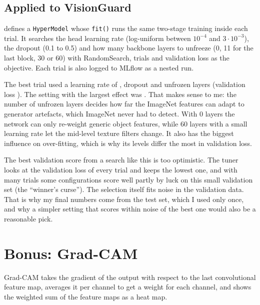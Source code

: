 \subsection*{Applied to VisionGuard}
 defines a \texttt{HyperModel} whose \texttt{fit()} runs the same two-stage
training inside each trial. It searches the head learning rate (log-uniform between $10^{-4}$ and
$3\cdot10^{-3}$), the dropout (0.1 to 0.5) and how many backbone layers to unfreeze (0, 11 for the
last block, 30 or 60) with RandomSearch, \vgTunerTrials{} trials and validation loss as the
objective. Each trial is also logged to MLflow as a nested run.


The best trial used a learning rate of \vgTunerBestLr, dropout \vgTunerBestDrop{} and
\vgTunerBestUnfrozen{} unfrozen layers (validation loss \vgTunerBestLoss). The setting with the
largest effect was \vgTunerMostImportant. That makes sense to me: the number of unfrozen layers
decides how far the ImageNet features can adapt to generator artefacts, which ImageNet never had to
detect. With 0 layers the network can only re-weight generic object features, while 60 layers with
a small learning rate let the mid-level texture filters change. It also has the biggest influence
on over-fitting, which is why its levels differ the most in validation loss.

The best validation score from a search like this is too optimistic. The tuner looks at the
validation loss of every trial and keeps the lowest one, and with many trials some configurations
score well partly by luck on this small validation set (the ``winner's curse''). The selection
itself fits noise in the validation data. That is why my final numbers come from the test set,
which I used only once, and why a simpler setting that scores within noise of the best one would
also be a reasonable pick.

\section*{Bonus: Grad-CAM}
Grad-CAM takes the gradient of the output with respect to the last convolutional feature map,
averages it per channel to get a weight for each channel, and shows the weighted sum of the feature
maps as a heat map.


